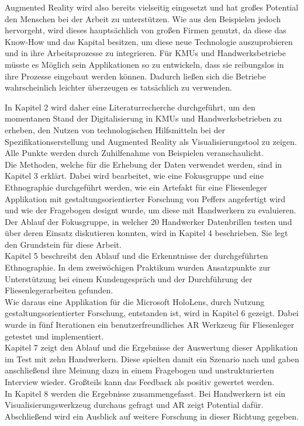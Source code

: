 Augmented Reality wird also bereits vielseitig eingesetzt und hat großes Potential den Menschen bei der Arbeit zu unterstützen. Wie aus den Beispielen jedoch hervorgeht, wird dieses hauptsächlich von großen Firmen genutzt, da diese das Know-How und das Kapital besitzen, um diese neue Technologie auszuprobieren und in ihre Arbeitsprozesse zu integrieren. Für KMUs und Handwerksbetriebe müsste es Möglich sein Applikationen so zu entwickeln, dass sie reibungslos in ihre Prozesse eingebaut werden können. Dadurch ließen sich die Betriebe wahrscheinlich leichter überzeugen es tatsächlich zu verwenden.

In Kapitel 2 wird daher eine Literaturrecherche durchgeführt, um den momentanen Stand der Digitalisierung in KMUs und Handwerksbetrieben zu erheben, den Nutzen von technologischen Hilfsmitteln bei der Spezifikationserstellung und Augmented Reality als Visualisierungstool zu zeigen. Alle Punkte werden durch Zuhilfenahme von Beispielen veranschaulicht. \\
Die Methoden, welche für die Erhebung der Daten verwendet werden, sind in Kapitel 3 erklärt. Dabei wird bearbeitet, wie eine Fokusgruppe und eine Ethnographie durchgeführt werden, wie ein Artefakt für eine Fliesenleger Applikation mit gestaltungsorientierter Forschung von Peffers angefertigt wird und wie der Fragebogen designt wurde, um diese mit Handwerkern zu evaluieren. \\
Der Ablauf der Fokusgruppe, in welcher 20 Handwerker Datenbrillen testen und über deren Einsatz diskutieren konnten, wird in Kapitel 4 beschrieben. Sie legt den Grundstein für diese Arbeit. \\
Kapitel 5 beschreibt den Ablauf und die Erkenntnisse der durchgeführten Ethnographie. In dem zweiwöchigen Praktikum wurden Ansatzpunkte zur Unterstützung bei einem Kundengespräch und der Durchführung der Fliesenlegerarbeiten gefunden. \\
Wie daraus eine Applikation für die Microsoft HoloLens, durch Nutzung gestaltungsorientierter Forschung, entstanden ist, wird in Kapitel 6 gezeigt. Dabei wurde in fünf Iterationen ein benutzerfreundliches AR Werkzeug für Fliesenleger getestet und implementiert. \\
Kapitel 7 zeigt den Ablauf und die Ergebnisse der Auswertung dieser Applikation im Test mit zehn Handwerkern. Diese spielten damit ein Szenario nach und gaben anschließend ihre Meinung dazu in einem Fragebogen und unstrukturierten Interview wieder. Großteils kann das Feedback als positiv gewertet werden. \\
In Kapitel 8 werden die Ergebnisse zusammengefasst. Bei Handwerkern ist ein Visualisierungswerkzeug durchaus gefragt und AR zeigt Potential dafür. Abschließend wird ein Ausblick auf weitere Forschung in dieser Richtung gegeben.